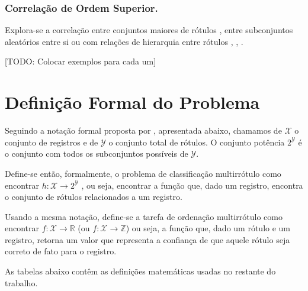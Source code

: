 \documentclass[runningheads,a4paper]{llncs}
\begin{document}
\subsubsection{Correlação de Ordem Superior.}

Explora-se a correlação entre conjuntos maiores de rótulos \cite{Read2008-bt}, entre subconjuntos aleatórios entre si \cite{Tsoumakas2007-cw} ou com relações de hierarquia entre rótulos \cite{Vens2008-yp}, \cite{Cesa-Bianchi2006-fk}, \cite{Esuli2008-on}.

[TODO: Colocar exemplos para cada um]

\section{Definição Formal do Problema}\label{sec:deformal}

Seguindo a notação formal proposta por \cite{Zhang2014-be}, apresentada abaixo, chamamos de $\mathcal{X}$ o conjunto de registros e de $\mathcal{Y}$ o conjunto total de rótulos. O conjunto potência $2^{\mathcal{Y}}$ é o conjunto com todos os subconjuntos possíveis de $\mathcal{Y}$.

Define-se então, formalmente, o problema de classificação multirrótulo como encontrar $h : \mathcal{X} \to 2^\mathcal{Y}$ , ou seja, encontrar a função que, dado um registro, encontra o conjunto de rótulos relacionados a um registro.

Usando a mesma notação, define-se a tarefa de ordenação multirrótulo como encontrar $f : \mathcal{X} \to \mathbb{R}$ (ou $f : \mathcal{X} \to \mathbb{Z}$) ou seja, a função que, dado um rótulo e um registro, retorna um valor que representa a confiança de que aquele rótulo seja correto de fato para o registro.

As tabelas abaixo contêm as definições matemáticas usadas no restante do trabalho.
\end{document}
